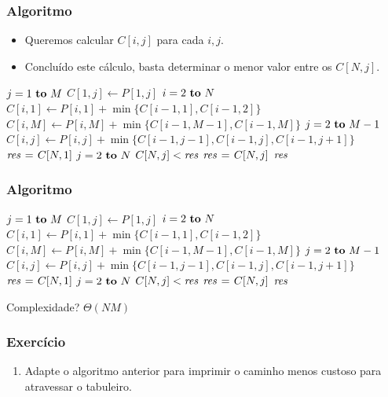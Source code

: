 \documentclass{beamer}
\begin{document}
\begin{frame}

\frametitle{Algoritmo}

\begin{itemize}
\item Queremos calcular $C[i, j]$ para cada $i, j$.
\item Concluído este cálculo, basta determinar o menor valor 
entre os $C[N, j]$.
\end{itemize}
\begin{small}
\begin{codebox}
\li \For $j = 1 \To M$
\li \Do $C[1, j] \gets P[1, j]$
    \End
\li \For $i = 2 \To N$
\li \Do $C[i, 1] \gets P[i, 1] + \min \{ C[i-1, 1], C[i-1, 2] \}$
\li   $C[i, M] \gets P[i, M] + \min \{ C[i-1, M-1], C[i-1, M] \}$
\li   \For $j = 2 \To M-1$
\li   \Do $C[i, j] \gets P[i, j] + \min \{ C[i-1, j-1], C[i-1, j], C[i-1, j+1] \}$
      \End
    \End
\li $\id{res} \gets C[N, 1]$
\li \For $j = 2 \To N$
\li \Do \If $C[N, j] < \id{res}$
\li    \Then $\id{res} \gets C[N, j]$
       \End
    \End
\li \Return $\id{res}$
\end{codebox}
\end{small}
\end{frame}

\begin{frame}

\frametitle{Algoritmo}

\begin{small}
\begin{codebox}
\li \For $j = 1 \To M$ 
\li \Do $C[1, j] \gets P[1, j]$
    \End
\li \For $i = 2 \To N$  
\li \Do $C[i, 1] \gets P[i, 1] + \min \{ C[i-1, 1], C[i-1, 2] \}$
\li   $C[i, M] \gets P[i, M] + \min \{ C[i-1, M-1], C[i-1, M] \}$
\li   \For $j = 2 \To M-1$  
\li   \Do $C[i, j] \gets P[i, j] + \min \{ C[i-1, j-1], C[i-1, j], C[i-1, j+1] \}$
      \End
    \End
\li $\id{res} \gets C[N, 1]$
\li \For $j = 2 \To N$
\li \Do \If $C[N, j] < \id{res}$
\li    \Then $\id{res} \gets C[N, j]$
       \End
    \End
\li \Return $\id{res}$
\end{codebox}
\end{small}

Complexidade? \pause \alert{$\Theta(N M)$}
\end{frame}

\begin{frame}
\frametitle{Exercício}

\begin{enumerate}
\item Adapte o algoritmo anterior para imprimir o caminho menos custoso
para atravessar o tabuleiro.
\end{enumerate}
\end{frame}
\end{document}
